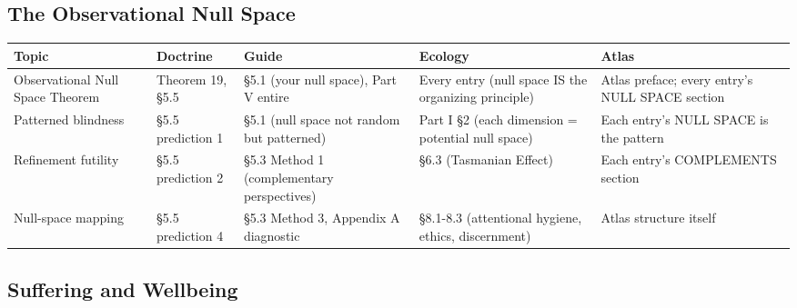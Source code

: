 \subsection*{The Observational Null Space}



\begin{longtable}{p{} p{} p{} p{} p{}}
\toprule
\textbf{Topic} & \textbf{Doctrine} & \textbf{Guide} & \textbf{Ecology} & \textbf{Atlas} \\
\midrule
\endhead
Observational Null Space Theorem & Theorem 19, §5.5 & §5.1 (your null space), Part V entire & Every entry (null space IS the organizing principle) & Atlas preface; every entry's NULL SPACE section \\
Patterned blindness & §5.5 prediction 1 & §5.1 (null space not random but patterned) & Part I §2 (each dimension = potential null space) & Each entry's NULL SPACE is the pattern \\
Refinement futility & §5.5 prediction 2 & §5.3 Method 1 (complementary perspectives) & §6.3 (Tasmanian Effect) & Each entry's COMPLEMENTS section \\
Null-space mapping & §5.5 prediction 4 & §5.3 Method 3, Appendix A diagnostic & §8.1-8.3 (attentional hygiene, ethics, discernment) & Atlas structure itself \\
\bottomrule
\end{longtable}



\subsection*{Suffering and Wellbeing}



